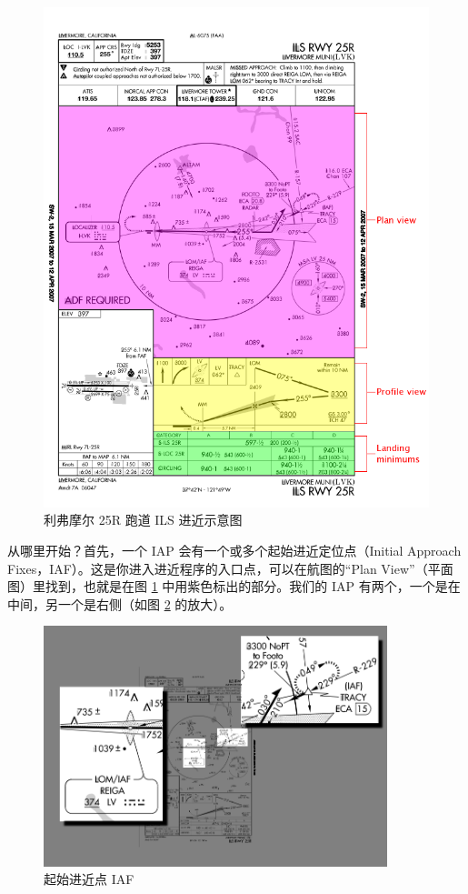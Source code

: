 \begin{figure}
  \begin{center}
    \includegraphics[width=14cm]{img/big_plate}
    \caption{利弗摩尔 25R 跑道 ILS 进近示意图}
    \label{fig:big_plate}
  \end{center}
\end{figure}

从哪里开始？首先，一个 IAP 会有一个或多个起始进近定位点（Initial Approach Fixes，IAF）。这是你进入进近程序的入口点，可以在航图的“Plan View”（平面图）里找到，也就是在图 \ref{fig:big_plate} 中用紫色标出的部分。我们的 IAP 有两个，一个是在中间，另一个是右侧（如图 \ref{fig:IAFs} 的放大）。

\begin{figure}
  \begin{center}
    \includegraphics[width=10cm]{img/IAFs}
    \caption{起始进近点 IAF}
    \label{fig:IAFs}
  \end{center}
\end{figure}

